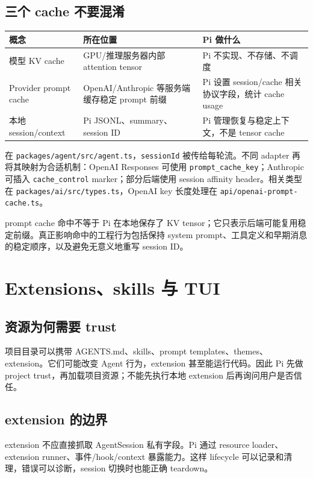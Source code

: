 \documentclass[UTF8,openany,11pt]{ctexbook}
\newcommand{\pathref}[1]{\texttt{#1}}
\begin{document}
\section{三个 cache 不要混淆}
\begin{longtable}{p{}p{}p{}}
\toprule
概念 & 所在位置 & Pi 做什么\\
\midrule
模型 KV cache & GPU/推理服务器内部 attention tensor & Pi 不实现、不存储、不调度\\
Provider prompt cache & OpenAI/Anthropic 等服务端缓存稳定 prompt 前缀 & Pi 设置 session/cache 相关协议字段，统计 cache usage\\
本地 session/context & Pi JSONL、summary、session ID & Pi 管理恢复与稳定上下文，不是 tensor cache\\
\bottomrule
\end{longtable}

在 \pathref{packages/agent/src/agent.ts}，\texttt{sessionId} 被传给每轮流。不同 adapter 再将其映射为合适机制：OpenAI Responses 可使用 \texttt{prompt\_cache\_key}；Anthropic 可插入 \texttt{cache\_control} marker；部分后端使用 session affinity header。相关类型在 \pathref{packages/ai/src/types.ts}，OpenAI key 长度处理在 \pathref{api/openai-prompt-cache.ts}。

\begin{warningbox}
prompt cache 命中不等于 Pi 在本地保存了 KV tensor；它只表示后端可能复用稳定前缀。真正影响命中的工程行为包括保持 system prompt、工具定义和早期消息的稳定顺序，以及避免无意义地重写 session ID。
\end{warningbox}

\chapter{Extensions、skills 与 TUI}

\section{资源为何需要 trust}
项目目录可以携带 AGENTS.md、skills、prompt templates、themes、extension。它们可能改变 Agent 行为，extension 甚至能运行代码。因此 Pi 先做 project trust，再加载项目资源；不能先执行本地 extension 后再询问用户是否信任。

\section{extension 的边界}
extension 不应直接抓取 AgentSession 私有字段。Pi 通过 resource loader、extension runner、事件/hook/context 暴露能力。这样 lifecycle 可以记录和清理，错误可以诊断，session 切换时也能正确 teardown。
\end{document}
